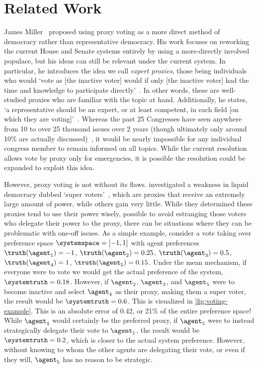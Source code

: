 \section{Related Work}\label{sec:related-work}
James Miller~\cite{Miller1969} proposed using proxy voting as a more direct method of
democracy rather than representative democracy.
His work focuses on reworking the current House and Senate systems entirely by using a
more-directly involved populace, but his ideas can still be relevant under the current
system.
In particular, he introduces the idea we call \textit{expert proxies},
those being individuals who would `vote as [the inactive voter] would if only
[the inactive voter] had the time and knowledge to participate
directly'~\cite{Miller1969}.
In other words, these are well-studied proxies who are familiar with the topic at hand.
Additionally, he states, `a representative should be an expert, or at least
competent, in each field [on which they are voting]'~\cite{Miller1969}.
Whereas the past 25 Congresses have seen anywhere from 10 to over 25 thousand issues
over 2 years (though ultimately only around 10\% are actually
discussed)~\cite{GovTrack2022}, it would be nearly impossible for any individual
congress member to remain informed on all topics.
While the current resolution allows vote by proxy only for emergencies, it is
possible the resolution could be expanded to exploit this idea.


However, proxy voting is not without its flaws.
 investigated a weakness in liquid democracy dubbed
`super voters'~\cite{Kling2015}, which are proxies that receive an extremely large
amount of power, while others gain very little.
While they determined these proxies tend to use their power wisely, possible to avoid
estranging those voters who delegate their power to the proxy, there can be
situations where they can be problematic with one-off issues.
As a simple example, consider a vote taking over preference
space $\systemspace = [-1, 1]$ with agent preferences $\truthof{\agent_1} = -1$,
$\truthof{\agent_2} = 0.25$, $\truthof{\agent_3} = 0.5$, $\truthof{\agent_4} = 1$,
$\truthof{\agent_5} = 0.15$.
Under the mean mechanism, if everyone were to vote
we would get the actual preference of the system, $\systemtruth = 0.18$.
However, if $\agent_2$, $\agent_3$, and $\agent_5$ were to become inactive and select
$\agent_4$ as their proxy, making them a super voter, the result would be
$\systemtruth = 0.6$.
This is visualized in \autoref{fig:voting-example}.
This is an absolute error of 0.42, or 21\% of the entire preference space!
While $\agent_4$ would certainly be the preferred proxy, if $\agent_5$ were to
instead strategically delegate their vote to $\agent_1$, the result would
be $\systemtruth = 0.2$, which is closer to the actual system preference.
However, without knowing to whom the other agents are delegating their vote, or even
if they will, $\agent_5$ has no reason to be strategic.

